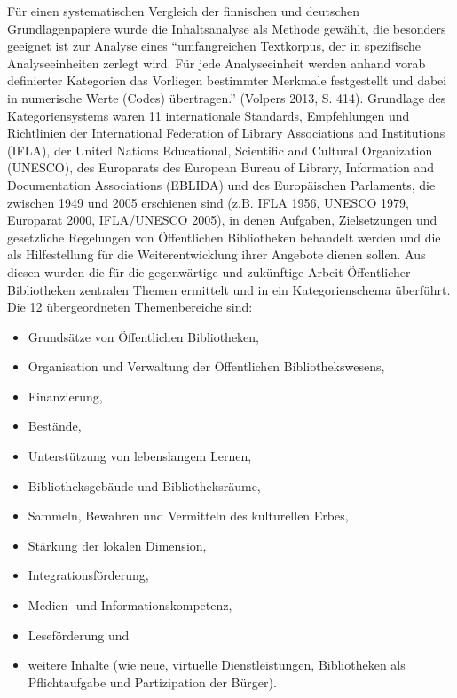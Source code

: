 \documentclass[a4paper,
fontsize=11pt,
oneside,
numbers=noperiodatend,
parskip=half-,
bibliography=totoc,
final
]{scrartcl}
\begin{document}
Für einen systematischen Vergleich der finnischen und deutschen
Grundlagenpapiere wurde die Inhaltsanalyse als Methode gewählt, die
besonders geeignet ist zur Analyse eines \enquote{umfangreichen
Textkorpus, der in spezifische Analyseeinheiten zerlegt wird. Für jede
Analyseeinheit werden anhand vorab definierter Kategorien das Vorliegen
bestimmter Merkmale festgestellt und dabei in numerische Werte (Codes)
übertragen.} (Volpers 2013, S. 414). Grundlage des Kategoriensystems
waren 11 internationale Standards, Empfehlungen und Richtlinien der
International Federation of Library Associations and Institutions
(IFLA), der United Nations Educational, Scientific and Cultural
Organization (UNESCO), des Europarats des European Bureau of Library,
Information and Documentation Associations (EBLIDA) und des Europäischen
Parlaments, die zwischen 1949 und 2005 erschienen sind (z.B. IFLA 1956,
UNESCO 1979, Europarat 2000, IFLA/UNESCO 2005), in denen Aufgaben,
Zielsetzungen und gesetzliche Regelungen von Öffentlichen Bibliotheken
behandelt werden und die als Hilfestellung für die Weiterentwicklung
ihrer Angebote dienen sollen. Aus diesen wurden die für die gegenwärtige
und zukünftige Arbeit Öffentlicher Bibliotheken zentralen Themen
ermittelt und in ein Kategorienschema überführt. Die 12 übergeordneten
Themenbereiche sind:

\begin{itemize}
\tightlist
\item
  Grundsätze von Öffentlichen Bibliotheken,
\item
  Organisation und Verwaltung der Öffentlichen Bibliothekswesens,
\item
  Finanzierung,
\item
  Bestände,
\item
  Unterstützung von lebenslangem Lernen,
\item
  Bibliotheksgebäude und Bibliotheksräume,
\item
  Sammeln, Bewahren und Vermitteln des kulturellen Erbes,
\item
  Stärkung der lokalen Dimension,
\item
  Integrationsförderung,
\item
  Medien- und Informationskompetenz,
\item
  Leseförderung und
\item
  weitere Inhalte (wie neue, virtuelle Dienstleistungen, Bibliotheken
  als Pflichtaufgabe und Partizipation der Bürger).
\end{itemize}
\end{document}
